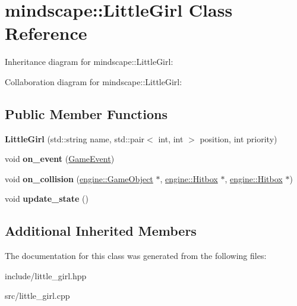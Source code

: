 \hypertarget{classmindscape_1_1_little_girl}{}\section{mindscape\+:\+:Little\+Girl Class Reference}
\label{classmindscape_1_1_little_girl}


Inheritance diagram for mindscape\+:\+:Little\+Girl\+:


Collaboration diagram for mindscape\+:\+:Little\+Girl\+:
\subsection*{Public Member Functions}
\begin{DoxyCompactItemize}
\item 
{\bfseries Little\+Girl} (std\+::string name, std\+::pair$<$ int, int $>$ position, int priority)\hypertarget{classmindscape_1_1_little_girl_aaa59cbc3cb94acf4004c39c670275ee9}{}\label{classmindscape_1_1_little_girl_aaa59cbc3cb94acf4004c39c670275ee9}

\item 
void {\bfseries on\+\_\+event} (\hyperlink{class_game_event}{Game\+Event})\hypertarget{classmindscape_1_1_little_girl_aaebf64e03ace85b494da14cad0343207}{}\label{classmindscape_1_1_little_girl_aaebf64e03ace85b494da14cad0343207}

\item 
void {\bfseries on\+\_\+collision} (\hyperlink{classengine_1_1_game_object}{engine\+::\+Game\+Object} $\ast$, \hyperlink{classengine_1_1_hitbox}{engine\+::\+Hitbox} $\ast$, \hyperlink{classengine_1_1_hitbox}{engine\+::\+Hitbox} $\ast$)\hypertarget{classmindscape_1_1_little_girl_a9b90c01bbe0510338a8dce10f07eff2a}{}\label{classmindscape_1_1_little_girl_a9b90c01bbe0510338a8dce10f07eff2a}

\item 
void {\bfseries update\+\_\+state} ()\hypertarget{classmindscape_1_1_little_girl_ac371a4bf4f1d4204eec7fb84551e6745}{}\label{classmindscape_1_1_little_girl_ac371a4bf4f1d4204eec7fb84551e6745}

\end{DoxyCompactItemize}
\subsection*{Additional Inherited Members}


The documentation for this class was generated from the following files\+:\begin{DoxyCompactItemize}
\item 
include/little\+\_\+girl.\+hpp\item 
src/little\+\_\+girl.\+cpp\end{DoxyCompactItemize}
